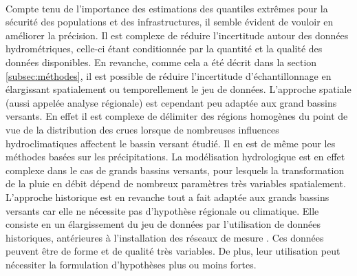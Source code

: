 	\paragraph{} Compte tenu de l'importance des estimations des quantiles extrêmes pour la sécurité des populations et des infrastructures, il semble évident de vouloir en améliorer la précision. Il est complexe de réduire l'incertitude autour des données hydrométriques, celle-ci étant conditionnée par la quantité et la qualité des données disponibles. En revanche, comme cela a été décrit dans la section \ref{subsec:méthodes}, il est possible de réduire l'incertitude d'échantillonnage en élargissant spatialement ou temporellement le jeu de données. L'approche spatiale (aussi appelée analyse régionale) est cependant peu adaptée aux grand bassins versants. En effet il est complexe de délimiter des régions homogènes du point de vue de la distribution des crues lorsque de nombreuses influences hydroclimatiques affectent le bassin versant étudié. Il en est de même pour les méthodes basées sur les précipitations. La modélisation hydrologique est en effet complexe dans le cas de grands bassins versants, pour lesquels la transformation de la pluie en débit dépend de nombreux paramètres très variables spatialement. L'approche historique est en revanche tout a fait adaptée aux grands bassins versants car elle ne nécessite pas d'hypothèse régionale ou climatique. Elle consiste en un élargissement du jeu de données par l'utilisation de données historiques, antérieures à l'installation des réseaux de mesure \citep{brazdil_historical_2006}. Ces données peuvent être de forme et de qualité très variables. De plus, leur utilisation peut nécessiter la formulation d'hypothèses plus ou moins fortes. 
	
